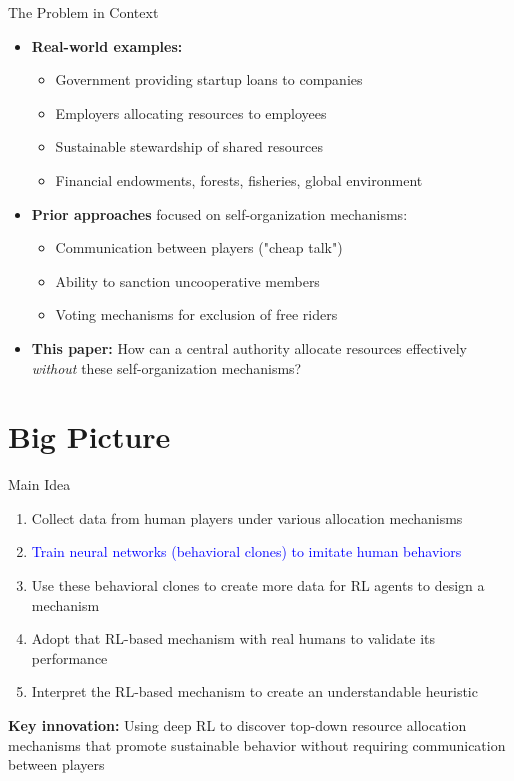 \documentclass[aspectratio=169]{beamer} %
\begin{document}
\begin{frame}{The Problem in Context}
\begin{itemize}
    \item \textbf{Real-world examples:}
    \begin{itemize}
        \item Government providing startup loans to companies
        \item Employers allocating resources to employees
        \item Sustainable stewardship of shared resources
        \item Financial endowments, forests, fisheries, global environment
    \end{itemize}
    \item \textbf{Prior approaches} focused on self-organization mechanisms:
    \begin{itemize}
        \item Communication between players ("cheap talk")
        \item Ability to sanction uncooperative members
        \item Voting mechanisms for exclusion of free riders
    \end{itemize}
    \item \textbf{This paper:} How can a central authority allocate resources effectively \textit{without} these self-organization mechanisms?
\end{itemize}
\end{frame}

\section{Big Picture}

\begin{frame}{Main Idea}
\begin{enumerate}
    \item Collect data from human players under various allocation mechanisms
    \item \textcolor{blue}{Train neural networks (behavioral clones) to imitate human behaviors}
    \item Use these behavioral clones to create more data for RL agents to design a mechanism 
    \item Adopt that RL-based mechanism with real humans to validate its performance
    \item Interpret the RL-based mechanism to create an understandable heuristic
\end{enumerate}

\begin{center}
\textbf{Key innovation:} Using deep RL to discover top-down resource allocation mechanisms that promote sustainable behavior without requiring communication between players
\end{center}
\end{frame}
\end{document}
